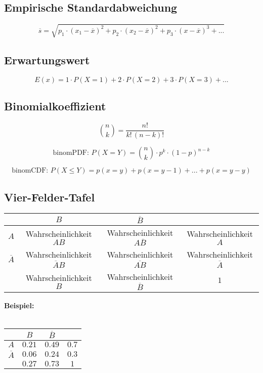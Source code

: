 \documentclass[a4paper,12pt]{article}
\begin{document}
	\subsection*{Empirische Standardabweichung}
		$$ \overline{s} = \sqrt{p_{1} \cdot (x_{1}-\overline{x})^{2}+p_{2} \cdot (x_{2}-\overline{x})^{2}+p_{3} \cdot (x-\overline{x})^{3}+...} $$
	\subsection*{Erwartungswert}
		$$ E(x) = 1 \cdot P(X = 1) + 2 \cdot P(X = 2) + 3 \cdot P(X = 3) + ... $$
	\subsection*{Binomialkoeffizient}
$$
\binom{n}{k} =  \frac{n!}{k!\,(n-k)!}
$$

$$
\text{binomPDF: } P(X=Y) = \binom{n}{k} \cdot p^{k} \cdot (1-p)^{n-k}
$$

$$
\text{binomCDF: } P(X\leq Y) = p(x=y) + p(x=y-1) + ... + p(x=y-y)
$$
	\subsection*{Vier-Felder-Tafel}
	\begin{center}
	\begin{tabular}{|c|c|c|c|}
	\hline 
	 & $B$ & $\overline{B}$ &  \\ 
	\hline
	$A$ & Wahrscheinlichkeit $AB$ & Wahrscheinlichkeit $A\overline{B}$ & Wahrscheinlichkeit $A$ \\ 
	\hline
	$\overline{A}$ & Wahrscheinlichkeit $\overline{A}B$ & Wahrscheinlichkeit $\overline{AB}$ & Wahrscheinlichkeit $\overline{A}$ \\ 
	\hline
	 & Wahrscheinlichkeit $B$ & Wahrscheinlichkeit $\overline{B}$ & $1$ \\ 
	\hline 
	\end{tabular} 
	\end{center}
	\textbf{Beispiel:} \\
	\\
	\begin{tabular}{|c|c|c|c|}
	\hline 
	 & $B$ & $\overline{B}$ &  \\ 
	\hline
	$A$ & $0.21$ & $0.49$ & $0.7$ \\ 
	\hline
	$\overline{A}$ & $0.06$ & $0.24$ & $0.3$ \\ 
	\hline
	 & $0.27$ & $0.73$ & $1$ \\ 
	\hline 
	\end{tabular}
	
\end{document}
